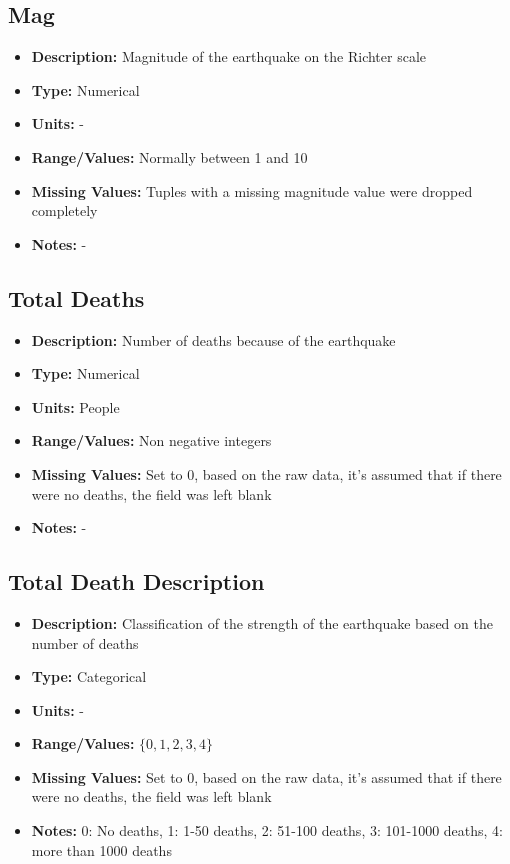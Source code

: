 \documentclass[a4paper]{article}
\begin{document}
\subsection{Mag}
\begin{itemize}
    \item \textbf{Description:} Magnitude of the earthquake on the Richter scale
    \item \textbf{Type:} Numerical
    \item \textbf{Units:} -
    \item \textbf{Range/Values:} Normally between 1 and 10
    \item \textbf{Missing Values:} Tuples with a missing magnitude value were dropped completely
    \item \textbf{Notes:} -
\end{itemize}

\subsection{Total Deaths}
\begin{itemize}
    \item \textbf{Description:} Number of deaths because of the earthquake
    \item \textbf{Type:} Numerical
    \item \textbf{Units:} People
    \item \textbf{Range/Values:} Non negative integers
    \item \textbf{Missing Values:} Set to 0, based on the raw data, it's assumed that if there were no deaths, the field was left blank
    \item \textbf{Notes:} -
\end{itemize}

\subsection{Total Death Description}
\begin{itemize}
    \item \textbf{Description:} Classification of the strength of the earthquake based on the number of deaths
    \item \textbf{Type:} Categorical
    \item \textbf{Units:} -
    \item \textbf{Range/Values:} $\{0,1,2,3,4 \}$
    \item \textbf{Missing Values:} Set to 0, based on the raw data, it's assumed that if there were no deaths, the field was left blank
    \item \textbf{Notes:} 0: No deaths, 1: 1-50 deaths, 2: 51-100 deaths, 3: 101-1000 deaths, 4: more than 1000 deaths
\end{itemize}
\end{document}
